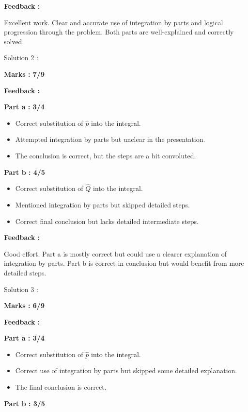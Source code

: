 \documentclass[a4paper,11pt]{article}
\begin{document}
\textbf{Feedback :}

Excellent work. Clear and accurate use of integration by parts and logical progression through the problem. Both parts are well-explained and correctly solved.



Solution 2 :

\textbf{Marks : 7/9}

\textbf{Feedback :}

\textbf{Part a : 3/4}

\begin{itemize}
    \item Correct substitution of $\hat{p}$ into the integral.
    \item Attempted integration by parts but unclear in the presentation.
    \item The conclusion is correct, but the steps are a bit convoluted.
\end{itemize}


\textbf{Part b : 4/5}

\begin{itemize}
    \item Correct substitution of $\hat{Q}$ into the integral.
    \item Mentioned integration by parts but skipped detailed steps.
    \item Correct final conclusion but lacks detailed intermediate steps.
\end{itemize}

\textbf{Feedback :}

Good effort. Part a is mostly correct but could use a clearer explanation of integration by parts. Part b is correct in conclusion but would benefit from more detailed steps.



Solution 3 :

\textbf{Marks : 6/9}

\textbf{Feedback :}

\textbf{Part a : 3/4}

\begin{itemize}
    \item Correct substitution of $\hat{p}$ into the integral.
    \item Correct use of integration by parts but skipped some detailed explanation.
    \item The final conclusion is correct.
\end{itemize}


\textbf{Part b : 3/5}
\end{document}
